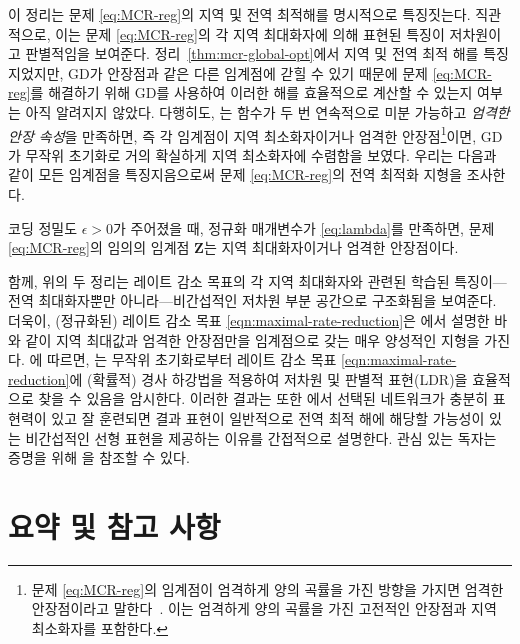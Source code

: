 \documentclass[../../book-main_ko.tex]{subfiles}
\begin{document}
이 정리는 문제 \eqref{eq:MCR-reg}의 지역 및 전역 최적해를 명시적으로 특징짓는다. 직관적으로, 이는 문제 \eqref{eq:MCR-reg}의 각 지역 최대화자에 의해 표현된 특징이 저차원이고 판별적임을 보여준다. 정리~\ref{thm:mcr-global-opt}에서 지역 및 전역 최적 해를 특징지었지만, GD가 안장점과 같은 다른 임계점에 갇힐 수 있기 때문에 문제 \eqref{eq:MCR-reg}를 해결하기 위해 GD를 사용하여 이러한 해를 효율적으로 계산할 수 있는지 여부는 아직 알려지지 않았다.
다행히도, \cite{sun2015nonconvex,lee2016gradient}는 함수가 두 번 연속적으로 미분 가능하고 {\em 엄격한 안장 속성}을 만족하면, 즉 각 임계점이 지역 최소화자이거나 엄격한 안장점\footnote{문제 \eqref{eq:MCR-reg}의 임계점이 엄격하게 양의 곡률을 가진 방향을 가지면 엄격한 안장점이라고 말한다~\cite{sun2015nonconvex}. 이는 엄격하게 양의 곡률을 가진 고전적인 안장점과 지역 최소화자를 포함한다.}이면, GD가 무작위 초기화로 거의 확실하게 지역 최소화자에 수렴함을 보였다. 우리는 다음과 같이 모든 임계점을 특징지음으로써 문제 \eqref{eq:MCR-reg}의 전역 최적화 지형을 조사한다.

 \begin{theorem}[\bf 양성 전역 최적화 지형]\label{thm:mcr-benign-opt-landscape}
        코딩 정밀도 $\epsilon > 0$가 주어졌을 때, 정규화 매개변수가 \eqref{eq:lambda}를 만족하면,
        문제 \eqref{eq:MCR-reg}의 임의의 임계점 $\bm Z$는 지역 최대화자이거나 엄격한 안장점이다.
\end{theorem}
함께, 위의 두 정리는 레이트
감소 목표의 각 지역 최대화자와 관련된 학습된 특징이—전역 최대화자뿐만 아니라—비간섭적인 저차원 부분 공간으로 구조화됨을 보여준다. 더욱이, (정규화된) 레이트 감소 목표 \eqref{eqn:maximal-rate-reduction}은 에서 설명한 바와 같이 지역 최대값과 엄격한 안장점만을 임계점으로 갖는 매우 양성적인 지형을 가진다.
\cite{sun2015nonconvex,lee2016gradient}에 따르면, 는 무작위 초기화로부터 레이트 감소 목표 \eqref{eqn:maximal-rate-reduction}에 (확률적) 경사 하강법을 적용하여 저차원 및 판별적 표현(LDR)을 효율적으로 찾을 수 있음을 암시한다. 이러한 결과는 또한 에서 선택된 네트워크가 충분히 표현력이 있고 잘 훈련되면 결과 표현이 일반적으로 전역 최적 해에 해당할 가능성이 있는 비간섭적인 선형 표현을 제공하는 이유를 간접적으로 설명한다.
관심 있는 독자는 증명을 위해 \cite{wang2024global}을 참조할 수 있다.

\section{요약 및 참고 사항}
\end{document}
